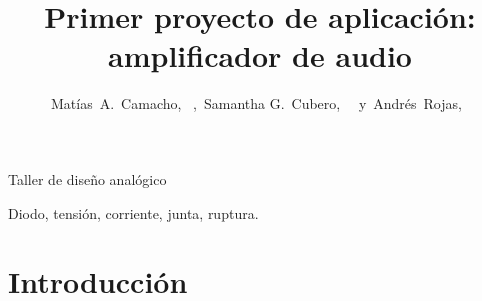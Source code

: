 \documentclass[journal, onecolumn]{IEEEtran}
\begin{document}
%
\title{Primer proyecto de aplicación: amplificador de audio}


\author{Matías~A.~Camacho,~
        ,~Samantha G.~Cubero,~
        ~y~Andrés~Rojas,~
}

%
{Taller de diseño analógico}


\maketitle




\clearpage
\tableofcontents
\clearpage

\begin{IEEEkeywords}
Diodo, tensión, corriente, junta, ruptura.
\end{IEEEkeywords}


\section{Introducción}
\end{document}
